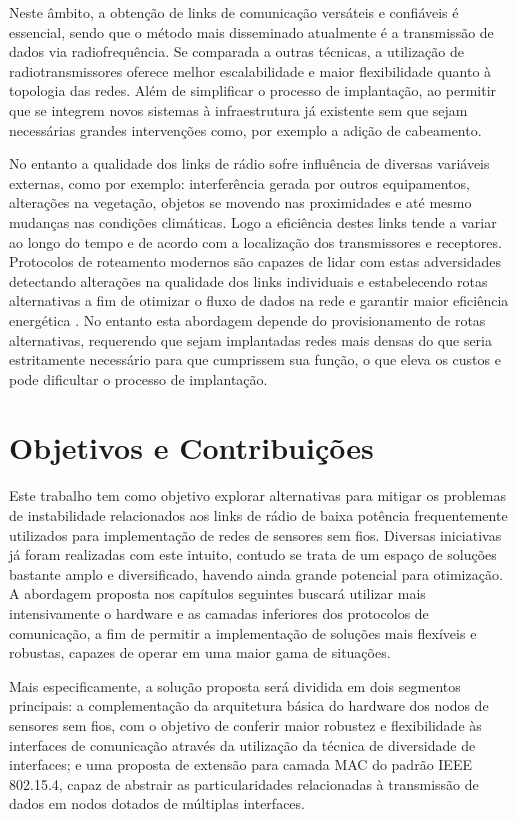 \documentclass[
	12pt,				%
	openright,			%
	oneside,
	a4paper,			%
	english,			%
	french,				%
	spanish,			%
	brazil				%
	]{abntex2}
\begin{document}
Neste âmbito, a obtenção de links de comunicação versáteis e confiáveis é essencial, sendo que o método mais disseminado atualmente é a transmissão de dados via radiofrequência. Se comparada a outras técnicas, a utilização de radiotransmissores oferece melhor escalabilidade e maior flexibilidade quanto à topologia das redes. Além de simplificar o processo de implantação, ao permitir que se integrem novos sistemas à infraestrutura já existente sem que sejam necessárias grandes intervenções como, por exemplo a adição de cabeamento.

No entanto a qualidade dos links de rádio sofre influência de diversas variáveis externas, como por exemplo: interferência gerada por outros equipamentos, alterações na vegetação, objetos se movendo nas proximidades e até mesmo mudanças nas condições climáticas. Logo a eficiência destes links tende a variar ao longo do tempo e de acordo com a localização dos transmissores e receptores\cite{Kusy2011}. Protocolos de roteamento modernos são capazes de lidar com estas adversidades detectando alterações na qualidade dos links individuais e estabelecendo rotas alternativas a fim de otimizar o fluxo de dados na rede e garantir maior eficiência energética \cite{Gnawali2009}. No entanto esta abordagem depende do provisionamento de rotas alternativas, requerendo que sejam implantadas redes mais densas do que seria estritamente necessário para que cumprissem sua função, o que eleva os custos e pode dificultar o processo de implantação.

\section{Objetivos e Contribuições}
Este trabalho tem como objetivo explorar alternativas para mitigar os problemas de instabilidade relacionados aos links de rádio de baixa potência frequentemente utilizados para implementação de redes de sensores sem fios. Diversas iniciativas já foram realizadas com este intuito, contudo se trata de um espaço de soluções bastante amplo e diversificado, havendo ainda grande potencial para otimização. A abordagem proposta nos capítulos seguintes buscará utilizar mais intensivamente o hardware e as camadas inferiores dos protocolos de comunicação, a fim de permitir a implementação de soluções mais flexíveis e robustas, capazes de operar em uma maior gama de situações.

Mais especificamente, a solução proposta será dividida em dois segmentos principais: a complementação da arquitetura básica do hardware dos nodos de sensores sem fios, com o objetivo de conferir maior robustez e flexibilidade às interfaces de comunicação através da utilização da técnica de diversidade de interfaces; e uma proposta de extensão para camada MAC do padrão IEEE 802.15.4, capaz de abstrair as particularidades relacionadas à transmissão de dados em nodos dotados de múltiplas interfaces.
\end{document}
